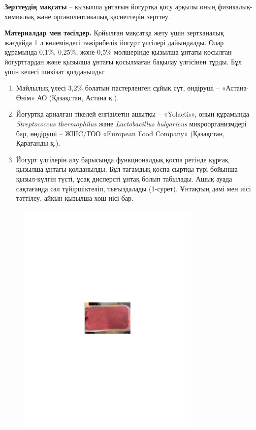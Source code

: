 {\bfseries Зерттеудің мақсаты} -- қызылша ұнтағын йогуртқа қосу арқылы оның
физикалық-химиялық және органолептикалық қасиеттерін зерттеу.

{\bfseries Материалдар мен тәсілдер.} Қойылған мақсатқа жету үшін
зертханалық жағдайда 1 л көлеміндегі тәжірибелік йогурт үлгілері
дайындалды. Олар құрамында 0,1\%, 0,25\%, және 0,5\% мөлшерінде қызылша
ұнтағы қосылған йогурттардан және қызылша ұнтағы қосылмаған бақылау
үлгісінен тұрды. Бұл үшін келесі шикізат қолданылды:

\begin{enumerate}
\def\labelenumi{\arabic{enumi}.}
\item
  Майлылық үлесі 3,2\% болатын пастерленген сұйық сүт, өндіруші --
  «Астана-Өнім» АО (Қазақстан, Астана қ.).
\item
  Йогуртқа арналған тікелей енгізілетін ашытқы -- «Yolactis», оның
  құрамында \emph{Streptococcus thermophilus} және \emph{Lactobacillus
  bulgaricus} микроорганизмдері бар, өндіруші -- ЖШC/ТОО «European Food
  Company» (Қазақстан, Қарағанды қ.).
\item
  Йогурт үлгілерін алу барысында функционалдық қоспа ретінде құрғақ
  қызылша ұнтағы қолданылды. Бұл тағамдық қоспа сыртқы түрі бойынша
  қызыл-күлгін түсті, ұсақ дисперсті ұнтақ болып табылады. Ашық ауада
  сақтағанда сәл түйіршіктеліп, тығыздалады (1-сурет). Ұнтақтың дәмі мен
  иісі тәттілеу, айқын қызылша хош иісі бар.
\end{enumerate}

\begin{figure}[H]
	\centering
	\includegraphics[width=0.8\textwidth]{media/pish3/image7}
	\caption*{}
\end{figure}



